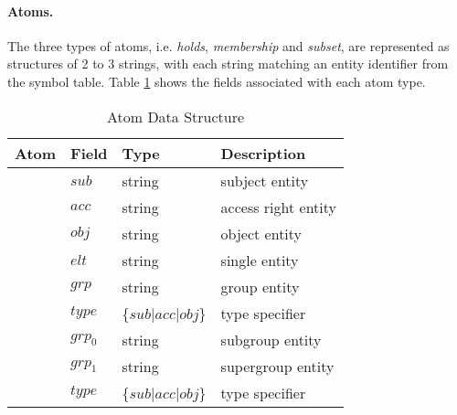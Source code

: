 \documentclass[11pt]{report}
\begin{document}
          \paragraph{Atoms.}

            The three types of atoms, i.e. {\em holds}, {\em membership}
            and {\em subset}, are represented as structures of 2 to 3
            strings, with each string matching an entity identifier from
            the symbol table. Table \ref{tabl-polup-atdsr} shows the
            fields associated with each atom type.

            \begin{table}[tbhp]
              \begin{center}
                \begin{tabular}[t]{|l|l|l|l|}
                  \hline
                  \textbf{Atom}             & \textbf{Field} & \textbf{Type}             & \textbf{Description} \\
                  \hline
                  {\multirow{3}{*}{holds}}  & $sub$          & string                    & subject entity \\
                  \cline{2-4}
                                            & $acc$          & string                    & access right entity \\
                  \cline{2-4}
                                            & $obj$          & string                    & object entity \\
                  \hline
                  {\multirow{3}{*}{member}} & $elt$          & string                    & single entity \\
                  \cline{2-4}
                                            & $grp$          & string                    & group entity \\
                  \cline{2-4}
                                            & $type$         & \{$sub$$|$$acc$$|$$obj$\} & type specifier \\
                  \hline
                  {\multirow{3}{*}{subset}} & $grp_0$        & string                    & subgroup entity \\
                  \cline{2-4}
                                            & $grp_1$        & string                    & supergroup entity \\
                  \cline{2-4}
                                            & $type$         & \{$sub$$|$$acc$$|$$obj$\} & type specifier \\
                  \hline
                \end{tabular}
              \end{center}
              \caption{Atom Data Structure}
              \label{tabl-polup-atdsr}
            \end{table}
\end{document}
